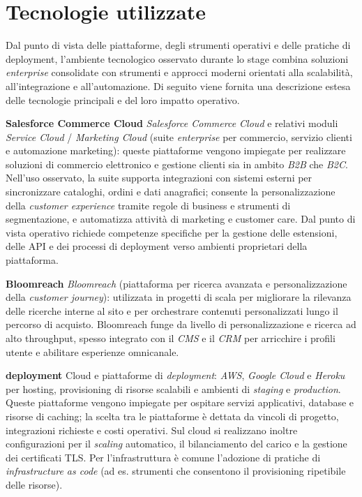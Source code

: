 \section{Tecnologie utilizzate}

Dal punto di vista delle piattaforme, degli strumenti operativi e delle pratiche di deployment, l’ambiente tecnologico osservato durante lo stage combina soluzioni \emph{enterprise} 
consolidate con strumenti e approcci moderni orientati alla scalabilità, all’integrazione e all’automazione. 
Di seguito viene fornita una descrizione estesa delle tecnologie principali e del loro impatto operativo.

\medskip
\noindent\textbf{Salesforce Commerce Cloud}
\emph{Salesforce Commerce Cloud} e relativi moduli \emph{Service Cloud} / \emph{Marketing Cloud} (suite \emph{enterprise} per commercio, servizio clienti e automazione marketing): 
queste piattaforme vengono impiegate per realizzare soluzioni di commercio elettronico e gestione clienti sia in ambito \emph{B2B} che \emph{B2C}. Nell’uso osservato, la suite supporta 
integrazioni con sistemi esterni per sincronizzare cataloghi, ordini e dati anagrafici; consente la personalizzazione della \emph{customer experience} tramite regole di business e strumenti di segmentazione,
e automatizza attività di marketing e customer care. Dal punto di vista operativo richiede competenze specifiche per la gestione delle estensioni, delle API e dei processi di deployment 
verso ambienti proprietari della piattaforma.

\medskip
\noindent\textbf{Bloomreach}
\emph{Bloomreach} (piattaforma per ricerca avanzata e personalizzazione della \emph{customer journey}): utilizzata in progetti di scala per migliorare la rilevanza delle ricerche 
interne al sito e per orchestrare contenuti personalizzati lungo il percorso di acquisto. Bloomreach funge da livello di personalizzazione e ricerca ad alto throughput, spesso integrato 
con il \emph{CMS} e il \emph{CRM} per arricchire i profili utente e abilitare esperienze omnicanale.

\medskip
\noindent\textbf{deployment}
Cloud e piattaforme di \emph{deployment}: \emph{AWS}, \emph{Google Cloud} e \emph{Heroku} per hosting, provisioning di risorse scalabili e ambienti di \emph{staging} e \emph{production}. 
Queste piattaforme vengono impiegate per ospitare servizi applicativi, database e risorse di caching; la scelta tra le piattaforme è dettata da vincoli di progetto, integrazioni richieste e costi operativi. 
Sul cloud si realizzano inoltre configurazioni per il \emph{scaling} automatico, il bilanciamento del carico e la gestione dei certificati TLS. Per l’infrastruttura 
è comune l’adozione di pratiche di \emph{infrastructure as code} (ad es. strumenti che consentono il provisioning ripetibile delle risorse).

